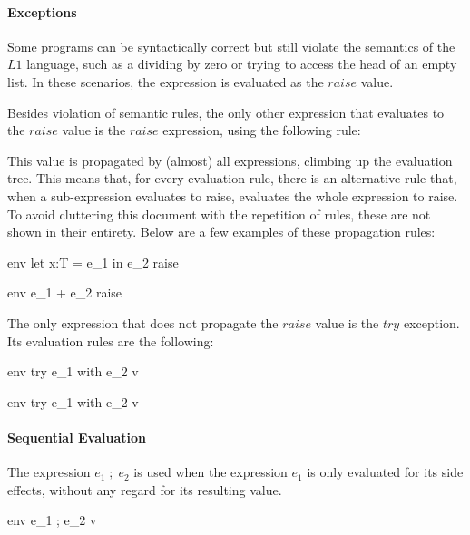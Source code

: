 \documentclass{article}
\begin{document}
\paragraph{Exceptions}

Some programs can be syntactically correct but still violate the semantics of the $L1$ language, such as a dividing by zero or trying to access the head of an empty list.
In these scenarios, the expression is evaluated as the $raise$ value. 

Besides violation of semantic rules, the only other expression that evaluates to the $raise$ value is the $raise$ expression, using the following rule:


This value is propagated by (almost) all expressions, climbing up the evaluation tree.
This means that, for every evaluation rule, there is an alternative rule that, when a sub-expression evaluates to raise, evaluates the whole expression to raise.
To avoid cluttering this document with the repetition of rules, these are not shown in their entirety. 
Below are a few examples of these propagation rules:

	{\mbox{env} \vdash let \; x:T = e_1 \; in \; e_2 \Downarrow raise}

	{\mbox{env} \vdash e_1 + e_2 \Downarrow raise}

The only expression that does not propagate the $raise$ value is the $try$ exception.
Its evaluation rules are the following:

	{\mbox{env} \vdash try \; e_1 \; with \; e_2 \Downarrow v}
	
	{\mbox{env} \vdash try \; e_1 \; with \; e_2 \Downarrow v}

\paragraph{Sequential Evaluation}
The expression $e_1 \; ; \; e_2$ is used when the expression $e_1$ is only evaluated for its side effects, without any regard for its resulting value.

	{\mbox{env} \vdash e_1 \; ; \; e_2 \Downarrow v}
	
\end{document}
